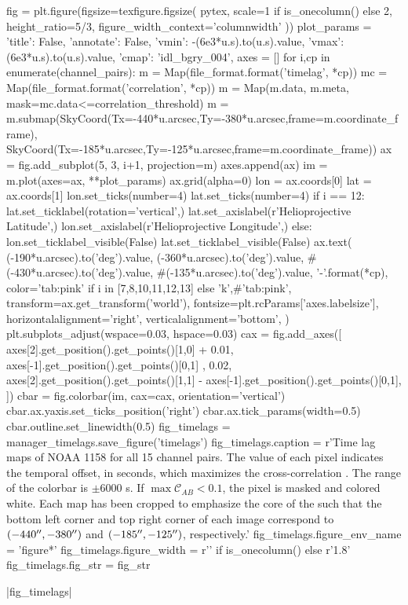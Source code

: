 \begin{pycode}
fig = plt.figure(figsize=texfigure.figsize(
    pytex,
    scale=1 if is_onecolumn() else 2,
    height_ratio=5/3,
    figure_width_context='columnwidth'
))
plot_params = {
    'title': False, 
    'annotate': False,
    'vmin': -(6e3*u.s).to(u.s).value,
    'vmax': (6e3*u.s).to(u.s).value,
    'cmap': 'idl_bgry_004',
}
axes = []
for i,cp in enumerate(channel_pairs):
    m = Map(file_format.format('timelag', *cp))
    mc = Map(file_format.format('correlation', *cp))
    m = Map(m.data, m.meta, mask=mc.data<=correlation_threshold)
    m = m.submap(SkyCoord(Tx=-440*u.arcsec,Ty=-380*u.arcsec,frame=m.coordinate_frame),
                 SkyCoord(Tx=-185*u.arcsec,Ty=-125*u.arcsec,frame=m.coordinate_frame))
    ax = fig.add_subplot(5, 3, i+1, projection=m)
    axes.append(ax)
    im = m.plot(axes=ax, **plot_params)
    ax.grid(alpha=0)
    lon = ax.coords[0]
    lat = ax.coords[1]
    lon.set_ticks(number=4)
    lat.set_ticks(number=4) 
    if i == 12:
        lat.set_ticklabel(rotation='vertical',)
        lat.set_axislabel(r'Helioprojective Latitude',)
        lon.set_axislabel(r'Helioprojective Longitude',)
    else:
        lon.set_ticklabel_visible(False)
        lat.set_ticklabel_visible(False)
    ax.text(
        (-190*u.arcsec).to('deg').value,
        (-360*u.arcsec).to('deg').value,
        #(-430*u.arcsec).to('deg').value,
        #(-135*u.arcsec).to('deg').value,
        '{}-{}'.format(*cp),
        color='tab:pink' if i in [7,8,10,11,12,13] else 'k',#'tab:pink',
        transform=ax.get_transform('world'),
        fontsize=plt.rcParams['axes.labelsize'],
        horizontalalignment='right',
        verticalalignment='bottom',
    )
plt.subplots_adjust(wspace=0.03, hspace=0.03)
cax = fig.add_axes([
    axes[2].get_position().get_points()[1,0] + 0.01,
    axes[-1].get_position().get_points()[0,1] ,
    0.02,
    axes[2].get_position().get_points()[1,1] - axes[-1].get_position().get_points()[0,1], 
])
cbar = fig.colorbar(im, cax=cax, orientation='vertical')
cbar.ax.yaxis.set_ticks_position('right')
cbar.ax.tick_params(width=0.5)
cbar.outline.set_linewidth(0.5)
fig_timelags = manager_timelags.save_figure('timelags')
fig_timelags.caption = r'Time lag maps of \AR{} NOAA 1158 for all 15 channel pairs. The value of each pixel indicates the temporal offset, in seconds, which maximizes the cross-correlation . The range of the colorbar is $\pm6000$ s. If $\max\mathcal{C}_{AB}<0.1$, the pixel is masked and colored white. Each map has been cropped to emphasize the core of the \AR{} such that the bottom left corner and top right corner of each image correspond to $(-440\mbox{$^{\prime\prime}$},-380\mbox{$^{\prime\prime}$})$ and $(-185\mbox{$^{\prime\prime}$},-125\mbox{$^{\prime\prime}$})$, respectively.'
fig_timelags.figure_env_name = 'figure*'
fig_timelags.figure_width = r'\columnwidth' if is_onecolumn() else r'1.8\columnwidth'
fig_timelags.fig_str = fig_str
\end{pycode}
|fig_timelags|

